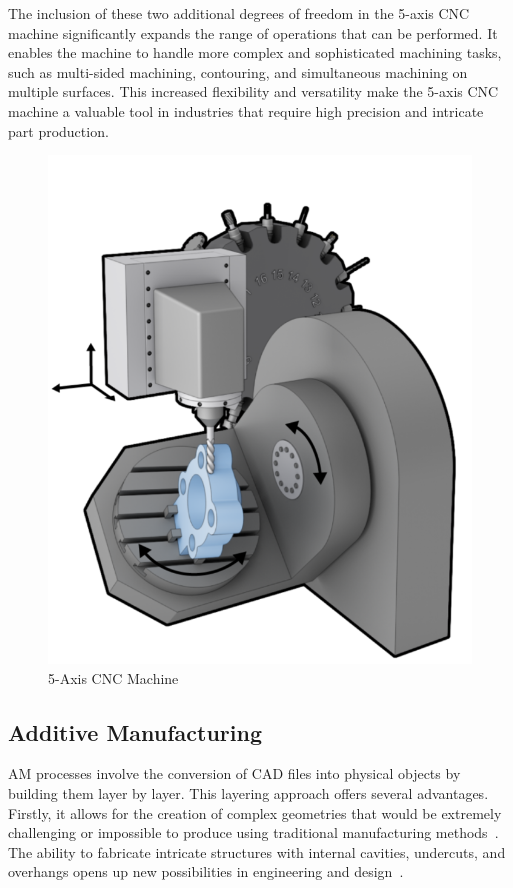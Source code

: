 The inclusion of these two additional degrees of freedom in the 5-axis CNC machine significantly expands the range of operations that can be performed. It enables the machine to handle more complex and sophisticated machining tasks, such as multi-sided machining, contouring, and simultaneous machining on multiple surfaces. This increased flexibility and versatility make the 5-axis CNC machine a valuable tool in industries that require high precision and intricate part production.

\begin{figure}[H]
	\centerline{\includegraphics[scale=.45]{figures/5ax.png}}
	\caption{5-Axis CNC Machine~\cite{5ax}}
	\label{5ax}
\end{figure}



\subsection{Additive Manufacturing}
AM processes involve the conversion of CAD files into physical objects by building them layer by layer. This layering approach offers several advantages. Firstly, it allows for the creation of complex geometries that would be extremely challenging or impossible to produce using traditional manufacturing methods~\cite{Prakash.2018}. The ability to fabricate intricate structures with internal cavities, undercuts, and overhangs opens up new possibilities in engineering and design~\cite{Abdulhameed.2019}.

